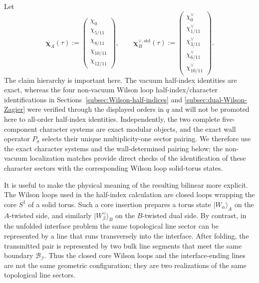 \documentclass[11pt,a4paper]{article}
\numberwithin{equation}{section}
\begin{document}
Let
\begin{equation}
  \boldsymbol\chi_A(\tau)
  :=
  \begin{pmatrix}
  \chi_0\\
  \chi_{5/11}\\
  \chi_{8/11}\\
  \chi_{10/11}\\
  \chi_{12/11}
  \end{pmatrix},
  \qquad
  \boldsymbol\chi_B^{\vee,\mathrm{std}}(\tau)
  :=
  \begin{pmatrix}
  \chi_0^\vee\\
  \chi_{1/11}^\vee\\
  \chi_{3/11}^\vee\\
  \chi_{6/11}^\vee\\
  \chi_{10/11}^\vee
  \end{pmatrix}.
  \label{eq:interface-character-vectors}
\end{equation}
The claim hierarchy is important here.  The vacuum half-index identities are exact, whereas the four non-vacuum Wilson loop half-index/character identifications in Sections~\ref{subsec:Wilson-half-indices} and \ref{subsec:dual-Wilson-Zagier} were verified through the displayed orders in $q$ and will not be promoted here to all-order half-index identities.  Independently, the two complete five-component character systems are exact modular objects, and the exact wall operator $P_\sigma$ selects their unique multiplicity-one sector pairing.  We therefore use the exact character systems and the wall-determined pairing below; the non-vacuum localization matches provide direct checks of the identification of these character sectors with the corresponding Wilson loop solid-torus states.

It is useful to make the physical meaning of the resulting bilinear more explicit.  The Wilson loops used in the half-index calculation are closed loops wrapping the core $S^1$ of a solid torus.  Such a core insertion prepares a torus state $|W_\alpha\rangle_A$ on the $A$-twisted side, and similarly $|W_\beta^\vee\rangle_B$ on the $B$-twisted dual side.  By contrast, in the unfolded interface problem the same topological line sector can be represented by a line that runs transversely into the interface.  After folding, the transmitted pair is represented by two bulk line segments that meet the same boundary $\mathcal B_{\mathcal I}$.  Thus the closed core Wilson loops and the interface-ending lines are not the same geometric configuration; they are two realizations of the same topological line sectors.
\end{document}

